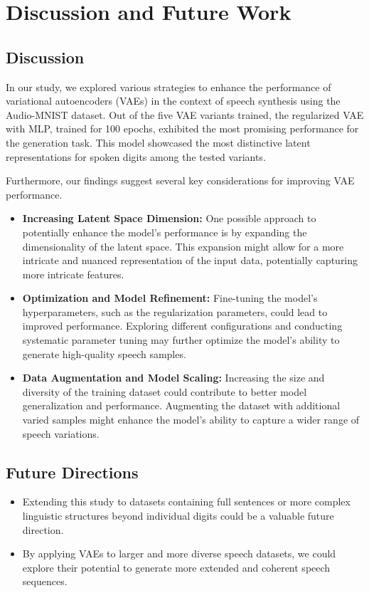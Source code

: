\documentclass[12pt]{article}
\begin{document}
\section{Discussion and Future Work}
\subsection{Discussion}
In our study, we explored various strategies to enhance the performance of variational autoencoders (VAEs) in the context of speech synthesis using the Audio-MNIST dataset. Out of the five VAE variants trained, the regularized VAE with MLP, trained for 100 epochs, exhibited the most promising performance for the generation task. This model showcased the most distinctive latent representations for spoken digits among the tested variants.

Furthermore, our findings suggest several key considerations for improving VAE performance.

\begin{itemize}
    \item \textbf{Increasing Latent Space Dimension: }One possible approach to potentially enhance the model's performance is by expanding the dimensionality of the latent space. This expansion might allow for a more intricate and nuanced representation of the input data, potentially capturing more intricate features.
    \item \textbf{Optimization and Model Refinement: }Fine-tuning the model's hyperparameters, such as the regularization parameters, could lead to improved performance. Exploring different configurations and conducting systematic parameter tuning may further optimize the model's ability to generate high-quality speech samples.
    \item \textbf{\textbf{Data Augmentation and Model Scaling: }}Increasing the size and diversity of the training dataset could contribute to better model generalization and performance. Augmenting the dataset with additional varied samples might enhance the model's ability to capture a wider range of speech variations.
\end{itemize}

\subsection{Future Directions}
\begin{itemize}
    \item Extending this study to datasets containing full sentences or more complex linguistic structures beyond individual digits could be a valuable future direction. 
    \item By applying VAEs to larger and more diverse speech datasets, we could explore their potential to generate more extended and coherent speech sequences.
\end{itemize}
\end{document}
